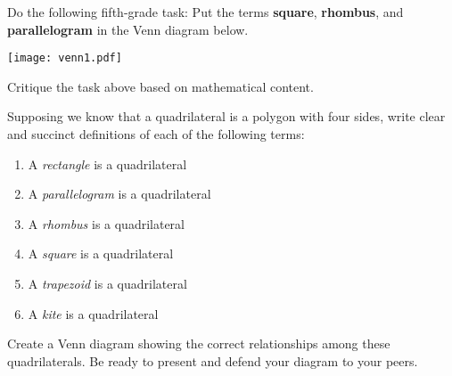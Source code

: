 \documentclass[nooutcomes]{ximera}
\begin{document}
\begin{problem}
Do the following fifth-grade task: Put the
terms \textbf{square}, \textbf{rhombus}, and \textbf{parallelogram} in
the Venn diagram below.  
\begin{image}
\texttt{[image: venn1.pdf]}
\end{image}
\end{problem}

\begin{problem} 
Critique the task above based on mathematical content.
\vfill
\end{problem}

\newpage 
\begin{problem}
Supposing we know that a quadrilateral is a polygon with four sides, write clear and succinct definitions of each of the following terms: 
\begin{enumerate}
\itemsep18pt
\item A \textit{rectangle} is a quadrilateral 
\item A \textit{parallelogram} is a quadrilateral
\item A \textit{rhombus} is a quadrilateral
\item A \textit{square} is a quadrilateral
\item A \textit{trapezoid} is a quadrilateral
\item A \textit{kite} is a quadrilateral
\end{enumerate}
\end{problem}
\bigskip

\begin{problem} 
Create a Venn diagram showing the correct relationships
among these quadrilaterals. Be ready to present and defend your
diagram to your peers.
\vfill
\end{problem}
\end{document}
